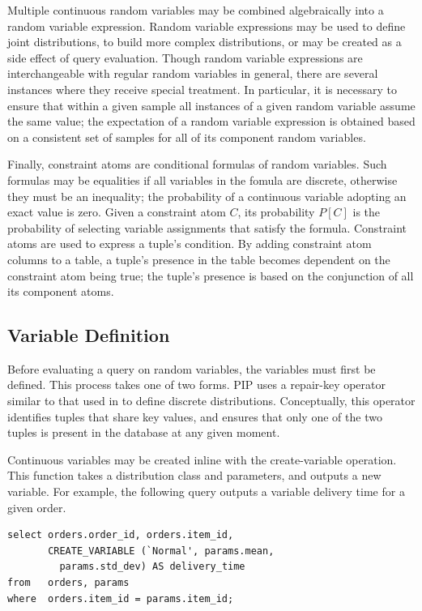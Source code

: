 Multiple continuous random variables may be combined algebraically into a random variable expression.  Random variable expressions may be used to define joint distributions, to build more complex distributions, or may be created as a side effect of query evaluation.  Though random variable expressions are interchangeable with regular random variables in general, there are several instances where they receive special treatment.  In particular, it is necessary to ensure that within a given sample all instances of a given random variable assume the same value; the expectation of a random variable expression is obtained based on a consistent set of samples for all of its component random variables.

Finally, constraint atoms are conditional formulas of random variables.  Such formulas may be equalities if all variables in the fomula are discrete, otherwise they must be an inequality; the probability of a continuous variable adopting an exact value is zero.  Given a constraint atom $C$, its probability $P[C]$ is the probability of selecting variable assignments that satisfy the formula.  Constraint atoms are used to express a tuple's condition.  By adding constraint atom columns to a table, a tuple's presence in the table becomes dependent on the constraint atom being true; the tuple's presence is based on the conjunction of all its component atoms.

\subsection{Variable Definition}
Before evaluating a query on random variables, the variables must first be defined.  This process takes one of two forms.  PIP uses a repair-key operator similar to that used in \cite{KochMayBMS2008} to define discrete distributions.  Conceptually, this operator identifies tuples that share key values, and ensures that only one of the two tuples is present in the database at any given moment.  

Continuous variables may be created inline with the create-variable operation.  This function takes a distribution class and parameters, and outputs a new variable.  For example, the following query outputs a variable delivery time for a given order.

\begin{verbatim}
select orders.order_id, orders.item_id,
       CREATE_VARIABLE (`Normal', params.mean,
         params.std_dev) AS delivery_time
from   orders, params
where  orders.item_id = params.item_id;
\end{verbatim}

